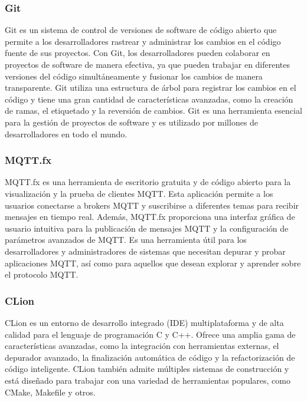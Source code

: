 \subsubsection{Git}

Git es un sistema de control de versiones de software de código abierto que permite a los desarrolladores rastrear y administrar los cambios en el código fuente de sus proyectos. Con Git, los desarrolladores pueden colaborar en proyectos de software de manera efectiva, ya que pueden trabajar en diferentes versiones del código simultáneamente y fusionar los cambios de manera transparente. Git utiliza una estructura de árbol para registrar los cambios en el código y tiene una gran cantidad de características avanzadas, como la creación de ramas, el etiquetado y la reversión de cambios. Git es una herramienta esencial para la gestión de proyectos de software y es utilizado por millones de desarrolladores en todo el mundo.


\subsubsection{MQTT.fx}

MQTT.fx es una herramienta de escritorio gratuita y de código abierto para la visualización y la prueba de clientes MQTT. Esta aplicación permite a los usuarios conectarse a brokers MQTT y suscribirse a diferentes temas para recibir mensajes en tiempo real. Además, MQTT.fx proporciona una interfaz gráfica de usuario intuitiva para la publicación de mensajes MQTT y la configuración de parámetros avanzados de MQTT. Es una herramienta útil para los desarrolladores y administradores de sistemas que necesitan depurar y probar aplicaciones MQTT, así como para aquellos que desean explorar y aprender sobre el protocolo MQTT.


\subsubsection{CLion}

CLion es un entorno de desarrollo integrado (IDE) multiplataforma y de alta calidad para el lenguaje de programación C y C++. Ofrece una amplia gama de características avanzadas, como la integración con herramientas externas, el depurador avanzado, la finalización automática de código y la refactorización de código inteligente. CLion también admite múltiples sistemas de construcción y está diseñado para trabajar con una variedad de herramientas populares, como CMake, Makefile y otros.


